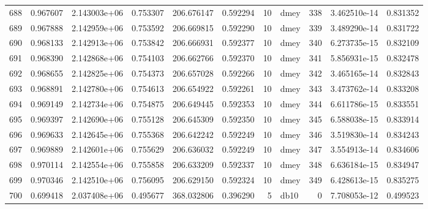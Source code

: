 \begin{tabular}{lrrrrrrlrrr}
688  &    0.967607 &        2.143003e+06 &  0.753307 &              206.676147 &    0.592294 &      10 &         dmey &    338 &   3.462510e-14 &      0.831352 \\
689  &    0.967888 &        2.142959e+06 &  0.753592 &              206.669815 &    0.592290 &      10 &         dmey &    339 &   3.489290e-14 &      0.831722 \\
690  &    0.968133 &        2.142913e+06 &  0.753842 &              206.666931 &    0.592377 &      10 &         dmey &    340 &   6.273735e-15 &      0.832109 \\
691  &    0.968390 &        2.142868e+06 &  0.754103 &              206.662766 &    0.592370 &      10 &         dmey &    341 &   5.856931e-15 &      0.832478 \\
692  &    0.968655 &        2.142825e+06 &  0.754373 &              206.657028 &    0.592266 &      10 &         dmey &    342 &   3.465165e-14 &      0.832843 \\
693  &    0.968891 &        2.142780e+06 &  0.754613 &              206.654922 &    0.592261 &      10 &         dmey &    343 &   3.473762e-14 &      0.833208 \\
694  &    0.969149 &        2.142734e+06 &  0.754875 &              206.649445 &    0.592353 &      10 &         dmey &    344 &   6.611786e-15 &      0.833551 \\
695  &    0.969397 &        2.142690e+06 &  0.755128 &              206.645309 &    0.592350 &      10 &         dmey &    345 &   6.588038e-15 &      0.833914 \\
696  &    0.969633 &        2.142645e+06 &  0.755368 &              206.642242 &    0.592249 &      10 &         dmey &    346 &   3.519830e-14 &      0.834243 \\
697  &    0.969889 &        2.142601e+06 &  0.755629 &              206.636032 &    0.592249 &      10 &         dmey &    347 &   3.554913e-14 &      0.834606 \\
698  &    0.970114 &        2.142554e+06 &  0.755858 &              206.633209 &    0.592337 &      10 &         dmey &    348 &   6.636184e-15 &      0.834947 \\
699  &    0.970346 &        2.142510e+06 &  0.756095 &              206.629150 &    0.592324 &      10 &         dmey &    349 &   6.428613e-15 &      0.835275 \\
700  &    0.699418 &        2.037408e+06 &  0.495677 &              368.032806 &    0.396290 &       5 &         db10 &      0 &   7.708053e-12 &      0.499523 \\

\end{tabular}

